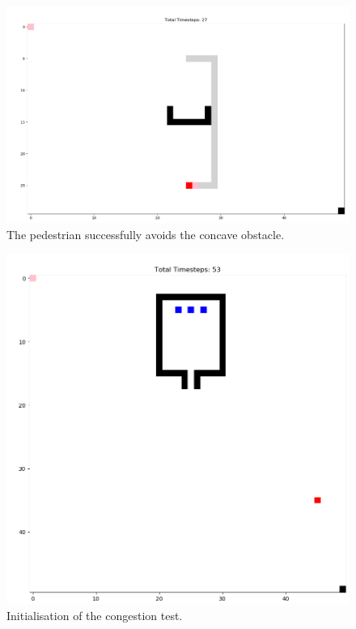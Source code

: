 \documentclass[10pt,a4paper]{article}
\begin{document}
\begin{figure}[h!]
    \centering
    \includegraphics[width=\textwidth]{pictures/end_task4_obst.PNG}
    \caption{The pedestrian successfully avoids the concave obstacle.}
    \label{fig:obst_end}
\end{figure}
\begin{figure}[h!]
    \centering
    \includegraphics[width=\textwidth]{pictures/start_task4_cong.PNG}
    \caption{Initialisation of the congestion test.}
    \label{fig:cong_start}
\end{figure}
\end{document}
